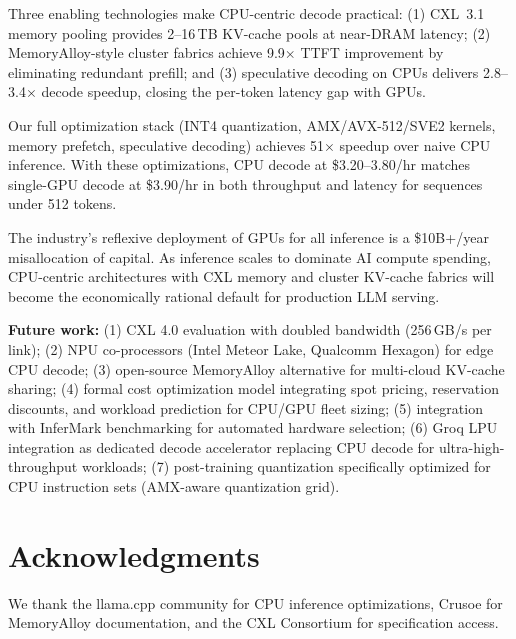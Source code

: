 \documentclass[conference,10pt]{IEEEtran}
\begin{document}
Three enabling technologies make CPU-centric decode practical: (1) CXL~3.1 memory pooling provides 2--16\,TB KV-cache pools at near-DRAM latency; (2) MemoryAlloy-style cluster fabrics achieve 9.9$\times$ TTFT improvement by eliminating redundant prefill; and (3) speculative decoding on CPUs delivers 2.8--3.4$\times$ decode speedup, closing the per-token latency gap with GPUs.

Our full optimization stack (INT4 quantization, AMX/AVX-512/SVE2 kernels, memory prefetch, speculative decoding) achieves 51$\times$ speedup over naive CPU inference. With these optimizations, CPU decode at \$3.20--3.80/hr matches single-GPU decode at \$3.90/hr in both throughput and latency for sequences under 512 tokens.

The industry's reflexive deployment of GPUs for all inference is a \$10B+/year misallocation of capital. As inference scales to dominate AI compute spending, CPU-centric architectures with CXL memory and cluster KV-cache fabrics will become the economically rational default for production LLM serving.

\textbf{Future work:} (1) CXL 4.0 evaluation with doubled bandwidth (256\,GB/s per link); (2) NPU co-processors (Intel Meteor Lake, Qualcomm Hexagon) for edge CPU decode; (3) open-source MemoryAlloy alternative for multi-cloud KV-cache sharing; (4) formal cost optimization model integrating spot pricing, reservation discounts, and workload prediction for CPU/GPU fleet sizing; (5) integration with InferMark benchmarking for automated hardware selection; (6) Groq LPU integration as dedicated decode accelerator replacing CPU decode for ultra-high-throughput workloads; (7) post-training quantization specifically optimized for CPU instruction sets (AMX-aware quantization grid).


\section*{Acknowledgments}
We thank the llama.cpp community for CPU inference optimizations, Crusoe for MemoryAlloy documentation, and the CXL Consortium for specification access.

\balance


\end{document}
